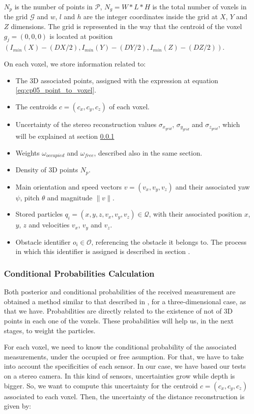 $N_p$ is the number of points in $\mathcal{P}$, $N_g = W * L * H$ is the total number of voxels in the grid $\mathcal{G}$ and $w$, $l$ and $h$ are the integer coordinates inside the grid at $X$, $Y$ and $Z$ dimensions. The grid is represented in the way that the centroid of the voxel $g_j=(0,0,0)$ is located at position $(I_{min}(X) - (DX/2), I_{min}(Y) - (DY/2), I_{min}(Z) - (DZ/2))$.

On each voxel, we store information related to:
\begin{itemize}
 \item The 3D associated points, assigned with the expression at equation \ref{eq:cp05_point_to_voxel}.
 \item The centroids $c=(c_x, c_y, c_z)$ of each voxel.
 \item Uncertainty of the stereo reconstruction values $\sigma_{x_{grid}}$, $\sigma_{y_{grid}}$ and $\sigma_{z_{grid}}$, which will be explained at section \ref{ch:chapter05_01_03_01}
 \item Weights $\omega_{occupied}$ and $\omega_{free}$, described also in the same section.
 \item Density of 3D points $N_p$.
 \item Main orientation and speed vectors $v=(v_x, v_y, v_z)$ and their associated yaw $\psi$, pitch $\theta$ and magnitude $\|v\|$.
 \item Stored particles $q_i = (x, y, z, v_x, v_y, v_z) \in \mathcal{Q}$, with their associated position $x$, $y$, $z$ and velocities $v_x$, $v_y$ and $v_z$.
 \item Obstacle identifier $o_i \in \mathcal{O}$, referencing the obstacle it belongs to. The process in which this identifier is assigned is described in section .
\end{itemize}

\subsubsection{Conditional Probabilities Calculation}\label{ch:chapter05_01_03_01}

Both posterior and conditional probabilities of the received measurement are obtained a method similar to that described in \cite{isard1998condensation}, for a three-dimensional case, as that we have. Probabilities are directly related to the existence of not of 3D points in each one of the voxels. These probabilities will help us, in the next stages, to weight the particles.

For each voxel, we need to know the conditional probability of the associated measurements, under the occupied or free asumption. For that, we have to take into account the specificities of each sensor. In our case, we have based our tests on a stereo camera. In this kind of sensors, uncertainties grow while depth is bigger. So, we want to compute this uncertainty for the centroid $c=(c_x, c_y, c_z)$ associated to each voxel. Then, the uncertainty of the distance reconstruction is given by:

